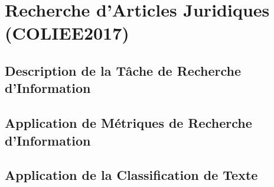 \chapter{Recherche d'Articles Juridiques (COLIEE2017)}
\label{chap:coliee}
\section{Description de la Tâche de Recherche d'Information}

\section{Application de Métriques de Recherche d'Information}

\section{Application de la Classification de Texte}

